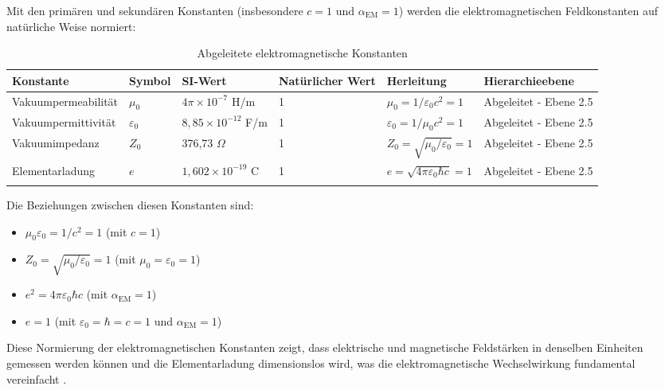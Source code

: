 \documentclass[12pt,a4paper]{article}
\newcommand{\alphaEM}{\alpha_{\text{EM}}}
\begin{document}
	Mit den primären und sekundären Konstanten (insbesondere $c = 1$ und $\alphaEM = 1$) werden die elektromagnetischen Feldkonstanten auf natürliche Weise normiert:
	
	\begin{table}[h]
		\centering
		\begin{adjustbox}{scale=0.7}
			\begin{tabular}{llllll}
				\hline
				\textbf{Konstante} & \textbf{Symbol} & \textbf{SI-Wert} & \textbf{Natürlicher Wert} & \textbf{Herleitung} & \textbf{Hierarchieebene} \\
				\hline
				Vakuumpermeabilität & $\mu_0$ & $4\pi \times 10^{-7}$ H/m & 1 & $\mu_0 = 1/\varepsilon_0c^2 = 1$ & Abgeleitet - Ebene 2.5 \\
				Vakuumpermittivität & $\varepsilon_0$ & $8,85 \times 10^{-12}$ F/m & 1 & $\varepsilon_0 = 1/\mu_0c^2 = 1$ & Abgeleitet - Ebene 2.5 \\
				Vakuumimpedanz & $Z_0$ & 376,73 $\Omega$ & 1 & $Z_0 = \sqrt{\mu_0/\varepsilon_0} = 1$ & Abgeleitet - Ebene 2.5 \\
				Elementarladung & $e$ & $1,602 \times 10^{-19}$ C & 1 & $e = \sqrt{4\pi\varepsilon_0\hbar c} = 1$ & Abgeleitet - Ebene 2.5 \\
				\hline
				\multicolumn{5}{c}{} \\
				\hline
			\end{tabular}
		\end{adjustbox}
		\caption{Abgeleitete elektromagnetische Konstanten }
		\label{tab:em_const}
	\end{table}
	
	Die Beziehungen zwischen diesen Konstanten sind:
	\begin{itemize}
		\item $\mu_0\varepsilon_0 = 1/c^2 = 1$ (mit $c = 1$)
		\item $Z_0 = \sqrt{\mu_0/\varepsilon_0} = 1$ (mit $\mu_0 = \varepsilon_0 = 1$)
		\item $e^2 = 4\pi\varepsilon_0\hbar c$ (mit $\alphaEM = 1$)
		\item $e = 1$ (mit $\varepsilon_0 = \hbar = c = 1$ und $\alphaEM = 1$)
	\end{itemize}
	
	Diese Normierung der elektromagnetischen Konstanten zeigt, dass elektrische und magnetische Feldstärken in denselben Einheiten gemessen werden können und die Elementarladung dimensionslos wird, was die elektromagnetische Wechselwirkung fundamental vereinfacht \cite{pascher_alpha_2025}.
	
\end{document}
